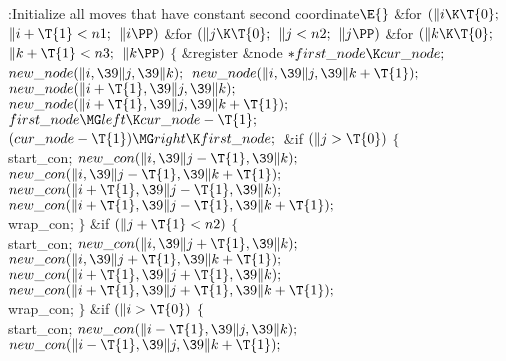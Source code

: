 \B{}:Initialize all moves that have constant second coordinate\X${}\E{}$\6
\&{for} ${}(\|i\K\T{0};{}$ ${}\|i+\T{1}<\\{n1};{}$ ${}\|i\PP){}$\1\6
\&{for} ${}(\|j\K\T{0};{}$ ${}\|j<\\{n2};{}$ ${}\|j\PP){}$\1\6
\&{for} ${}(\|k\K\T{0};{}$ ${}\|k+\T{1}<\\{n3};{}$ ${}\|k\PP){}$\5
${}\{{}$\1\6
\&{register} \&{node} ${}{*}\\{first\_node}\K\\{cur\_node};{}$\7
${}\\{new\_node}(\|i,\39\|j,\39\|k);{}$\6
${}\\{new\_node}(\|i,\39\|j,\39\|k+\T{1});{}$\6
${}\\{new\_node}(\|i+\T{1},\39\|j,\39\|k);{}$\6
${}\\{new\_node}(\|i+\T{1},\39\|j,\39\|k+\T{1});{}$\6
${}\\{first\_node}\MG\\{left}\K\\{cur\_node}-\T{1};{}$\6
${}(\\{cur\_node}-\T{1})\MG\\{right}\K\\{first\_node};{}$\6
\&{if} ${}(\|j>\T{0}){}$\5
${}\{{}$\1\6
\\{start\_con};\6
${}\\{new\_con}(\|i,\39\|j-\T{1},\39\|k);{}$\6
${}\\{new\_con}(\|i,\39\|j-\T{1},\39\|k+\T{1});{}$\6
${}\\{new\_con}(\|i+\T{1},\39\|j-\T{1},\39\|k);{}$\6
${}\\{new\_con}(\|i+\T{1},\39\|j-\T{1},\39\|k+\T{1});{}$\6
\\{wrap\_con};\6
\4${}\}{}$\2\6
\&{if} ${}(\|j+\T{1}<\\{n2}){}$\5
${}\{{}$\1\6
\\{start\_con};\6
${}\\{new\_con}(\|i,\39\|j+\T{1},\39\|k);{}$\6
${}\\{new\_con}(\|i,\39\|j+\T{1},\39\|k+\T{1});{}$\6
${}\\{new\_con}(\|i+\T{1},\39\|j+\T{1},\39\|k);{}$\6
${}\\{new\_con}(\|i+\T{1},\39\|j+\T{1},\39\|k+\T{1});{}$\6
\\{wrap\_con};\6
\4${}\}{}$\2\6
\&{if} ${}(\|i>\T{0}){}$\5
${}\{{}$\1\6
\\{start\_con};\6
${}\\{new\_con}(\|i-\T{1},\39\|j,\39\|k);{}$\6
${}\\{new\_con}(\|i-\T{1},\39\|j,\39\|k+\T{1});{}$\6
